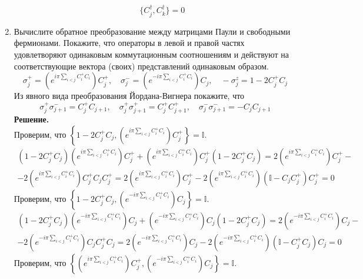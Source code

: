 \documentclass[12pt]{article}
\theoremstyle{definition}
\begin{document}
\begin{enumerate}
\begin{itemize}
\begin{multline}
        \end{multline}
        \begin{equation}
            \boxed{\{C^\dagger_j,C^\dagger_k\}=0}
        \end{equation}
    \end{itemize}
    \item Вычислите обратное преобразование между матрицами Паули и свободными фермионами. Покажите, что операторы в левой и правой частях удовлетворяют одинаковым коммутационным соотношениям и действуют на соответствующие вектора (своих) представлений одинаковым образом.
    \begin{equation}
        \sigma^+_j=\left(e^{i\pi\sum\limits_{i<j}C^+_iC_i}\right)C_j^+,\quad \sigma^-_j=\left(e^{-i\pi\sum\limits_{i<j}C^+_iC_i}\right)C_j,\quad-\sigma_j^z=1-2C^+_jC_j
    \end{equation}
    Из явного вида преобразования Йордана-Вигнера покажите, что
    \begin{equation}
        \sigma^+_j\sigma^-_{j+1}=C^+_jC_{j+1},\quad\sigma^+_j\sigma^+_{j+1}=C^+_jC^+_{j+1},\quad\sigma^-_j\sigma^-_{j+1}=-C_jC_{j+1}
    \end{equation}
    \textbf{Решение.}\\
    Проверим, что $\left\{1-2C^+_jC_j,\left(e^{i\pi\sum\limits_{i<j}C^+_iC_i}\right)C^+_j\right\}=\mathbb{I}$.
    \begin{multline*}
        (1-2C^+_jC_j)\left(e^{i\pi\sum\limits_{i<j}C^+_iC_i}\right)C^+_j+\left(e^{i\pi\sum\limits_{i<j}C^+_iC_i}\right)C^+_j(1-2C^+_jC_j)=2\left(e^{i\pi\sum\limits_{i<j}C^+_iC_i}\right)C^+_j-\\-2\left(e^{i\pi\sum\limits_{i<j}C^+_iC_i}\right)C^+_jC_jC^+_j=2\left(e^{i\pi\sum\limits_{i<j}C^+_iC_i}\right)C^+_j-2\left(e^{i\pi\sum\limits_{i<j}C^+_iC_i}\right)(\mathbb{I}-C_jC^+_j)C^+_j=0
    \end{multline*}
    Проверим, что $\left\{1-2C^+_jC_j,\left(e^{-i\pi\sum\limits_{i<j}C^+_iC_i}\right)C_j\right\}=\mathbb{I}$.
    \begin{multline*}
        (1-2C^+_jC_j)\left(e^{-i\pi\sum\limits_{i<j}C^+_iC_i}\right)C_j+\left(e^{-i\pi\sum\limits_{i<j}C^+_iC_i}\right)C_j(1-2C^+_jC_j)=2\left(e^{-i\pi\sum\limits_{i<j}C^+_iC_i}\right)C_j-\\-2\left(e^{-i\pi\sum\limits_{i<j}C^+_iC_i}\right)C_jC^+_jC_j=2\left(e^{-i\pi\sum\limits_{i<j}C^+_iC_i}\right)C_j-2\left(e^{-i\pi\sum\limits_{i<j}C^+_iC_i}\right)(\mathbb{I}-C^+_jC_j)C_j=0
    \end{multline*}
    Проверим, что $\left\{\left(e^{i\pi\sum\limits_{i<j}C^+_iC_i}\right)C_j^+,\left(e^{-i\pi\sum\limits_{i<j}C^+_iC_i}\right)C_j\right\}=\mathbb{I}$.

\end{enumerate}
\end{document}
